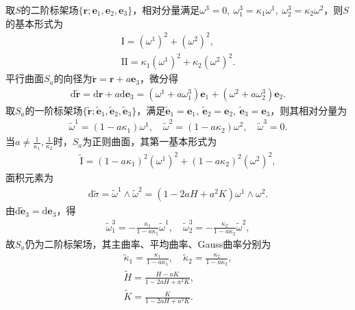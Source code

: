 \documentclass[../../main.tex]{subfiles}%
\begin{document}
\begin{solution}

取$S$的二阶标架场$\{\boldsymbol{r};\boldsymbol{e}_1,\boldsymbol{e}_2,\boldsymbol{e}_3\}$，相对分量满足$\omega^3=0,\ \omega_1^3=\kappa_1\omega^1,\ \omega_2^3=\kappa_2\omega^2$，则$S$的基本形式为
\begin{align}
\mathrm{I}=(\omega^1)^2+(\omega^2)^2,\label{eq:paral-I}\\
\mathrm{II}=\kappa_1(\omega^1)^2+\kappa_2(\omega^2)^2.\label{eq:paral-II}
\end{align}
平行曲面$S_a$的向径为$\tilde{\boldsymbol{r}}=\boldsymbol{r}+a\boldsymbol{e}_3$，微分得
\begin{align*}
\mathrm{d}\tilde{\boldsymbol{r}}=\mathrm{d}\boldsymbol{r}+a\mathrm{d}\boldsymbol{e}_3=(\omega^1+a\omega_1^3)\boldsymbol{e}_1+(\omega^2+a\omega_2^3)\boldsymbol{e}_2.
\end{align*}
取$S_a$的一阶标架场$\{\tilde{\boldsymbol{r}};\tilde{\boldsymbol{e}}_1,\tilde{\boldsymbol{e}}_2,\tilde{\boldsymbol{e}}_3\}$，满足$\tilde{\boldsymbol{e}}_1=\boldsymbol{e}_1,\ \tilde{\boldsymbol{e}}_2=\boldsymbol{e}_2,\ \tilde{\boldsymbol{e}}_3=\boldsymbol{e}_3$，则其相对分量为
\begin{align}
\tilde{\omega}^1=(1-a\kappa_1)\omega^1,\quad \tilde{\omega}^2=(1-a\kappa_2)\omega^2,\quad \tilde{\omega}^3=0.\label{eq:paral-omega}
\end{align}
当$a\neq\frac{1}{\kappa_1},\frac{1}{\kappa_2}$时，$S_a$为正则曲面，其第一基本形式为
\begin{align*}
\tilde{\mathrm{I}}=(1-a\kappa_1)^2(\omega^1)^2+(1-a\kappa_2)^2(\omega^2)^2,
\end{align*}
面积元素为
\begin{align}
\mathrm{d}\tilde{\sigma}=\tilde{\omega}^1\wedge\tilde{\omega}^2=(1-2aH+a^2K)\omega^1\wedge\omega^2.\label{eq:paral-area}
\end{align}
由$\mathrm{d}\tilde{\boldsymbol{e}}_3=\mathrm{d}\boldsymbol{e}_3$，得
\begin{align*}
\tilde{\omega}_1^3=-\frac{\kappa_1}{1-a\kappa_1}\tilde{\omega}^1,\quad \tilde{\omega}_2^3=-\frac{\kappa_2}{1-a\kappa_2}\tilde{\omega}^2,
\end{align*}
故$S_a$仍为二阶标架场，其主曲率、平均曲率、Gauss曲率分别为
\begin{align}
\tilde{\kappa}_1=\frac{\kappa_1}{1-a\kappa_1},\quad \tilde{\kappa}_2=\frac{\kappa_2}{1-a\kappa_2},\label{eq:paral-kappa}\\
\tilde{H}=\frac{H-aK}{1-2aH+a^2K},\label{eq:paral-H}\\
\tilde{K}=\frac{K}{1-2aH+a^2K}.\label{eq:paral-K}
\end{align}

\end{solution}
\end{document}
